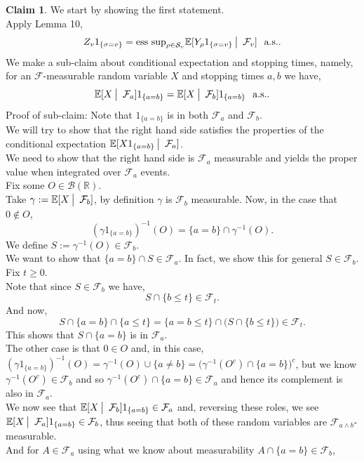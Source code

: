 \documentclass[12pt]{article}
\newcommand{\cB}{\mathcal{B}}
\newcommand{\cF}{\mathcal{F}}
\newcommand{\cS}{\mathcal{S}}
\newcommand{\E}{\mathbb{E}}
\newcommand{\R}{\mathbb{R}}
\newcommand{\quantifyspace}{\hspace{2px} \big | \hspace{5px}}
\newcommand{\spc}{\hspace{7 px}}
\newcommand{\ind}[1]{1_{\{#1\}}}
\newcommand{\als}{\text{a.s.}}
\newcommand{\esssup}{\text{ess sup}}
\theoremstyle{definition}
\newtheorem{claim}{Claim}
\begin{document}
\begin{claim}
    We start by showing the first statement. \\
    Apply Lemma 10,
    \[
        Z_v \ind{\sigma = v} = \esssup_{\rho \in \cS_v} \E[Y_\rho \ind{\sigma = v} \quantifyspace \cF_v] \spc \als.
    \]
    We make a sub-claim about conditional expectation and stopping times, namely, for an $\cF$-measurable random variable $X$ and stopping times $a, b$ we have,
    \[
        \E[X \quantifyspace \cF_a] \ind{a = b} = \E[X \quantifyspace \cF_b] \ind{a = b} \spc \als.
    \]
    Proof of sub-claim:
    Note that $\ind{a = b}$ is in both $\cF_a$ and $\cF_b$. \\
    We will try to show that the right hand side satisfies the properties of the conditional expectation $\E[X \ind{a = b} \quantifyspace \cF_a]$. \\
    We need to show that the right hand side is $\cF_a$ measurable and yields the proper value when integrated over $\cF_a$ events. \\
    Fix some $O \in \cB(\R)$. \\
    Take $\gamma := \E[X \quantifyspace \cF_b]$, by definition $\gamma$ is $\cF_b$ measurable.
    Now, in the case that $0 \not \in O$,
    \[
        (\gamma \ind{a = b})^{-1}(O) = \{a = b\} \cap \gamma^{-1}(O).
    \]
    We define $S := \gamma^{-1}(O) \in \cF_b$. \\
    We want to show that $\{a = b\} \cap S \in \cF_a$. In fact, we show this for general $S \in \cF_b$. \\
    Fix $t \geq 0$. \\
    Note that since $S \in \cF_b$ we have,
    \[
        S \cap \{b \leq t\} \in \cF_t.
    \]
    And now,
    \[
        S \cap \{a = b\} \cap \{a \leq t\} =
        \{a = b \leq t\} \cap \big ( S \cap \{b \leq t\} \big ) \in \cF_t.
    \]
    This shows that $S \cap \{a = b\}$ is in $\cF_a$. \\
    The other case is that $0 \in O$ and, in this case, $(\gamma \ind{a = b})^{-1}(O) = \gamma^{-1}(O) \cup \{a \neq b\} = \big (\gamma^{-1}(O^c) \cap \{a = b\} \big )^c$, but we know $\gamma^{-1}(O^c) \in \cF_b$ and so $\gamma^{-1}(O^c) \cap \{a = b\} \in \cF_a$ and hence its complement is also in $\cF_a$. \\
    We now see that $\E[X \quantifyspace \cF_b] \ind{a=b} \in \cF_a$ and, reversing these roles, we see $\E[X \quantifyspace \cF_a] \ind{a = b} \in \cF_b$, thus seeing that both of these random variables are $\cF_{a \wedge b}$-measurable. \\
    And for $A \in \cF_a$ using what we know about measurability $A \cap \{a = b\} \in \cF_b$,

\end{claim}
\end{document}
